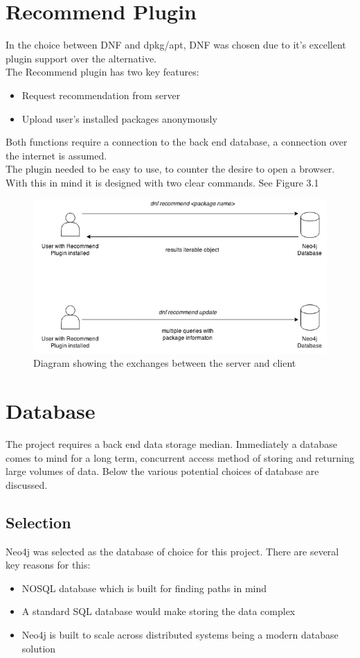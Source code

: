 \documentclass{l4proj}
\begin{document}
\section{Recommend Plugin}
In the choice between DNF and dpkg/apt, DNF was chosen due to it's excellent plugin support over the alternative.\\
The Recommend plugin has two key features:
\begin{itemize}
\item Request recommendation from server
\item Upload user's installed packages anonymously
\end{itemize}
Both functions require a connection to the back end database, a connection over the internet is assumed.\\
The plugin needed to be easy to use, to counter the desire to open a browser. With this in mind it is designed with two clear commands. See Figure 3.1\\
\begin{figure}
\includegraphics[scale=0.7]{images/recommend_api.png}
\caption{Diagram showing the exchanges between the server and client}
\end{figure}


\section{Database}
The project requires a back end data storage median. Immediately a database comes to mind for a long term, concurrent access method of storing and returning large volumes of data. Below the various potential choices of database are discussed.

\subsection{Selection}
Neo4j was selected as the database of choice for this project. There are several key reasons for this:
\begin{itemize}
\item NOSQL database which is built for finding paths in mind
\item A standard SQL database would make storing the data complex
\item Neo4j is built to scale across distributed systems being a modern database solution
\end{itemize}
\end{document}

